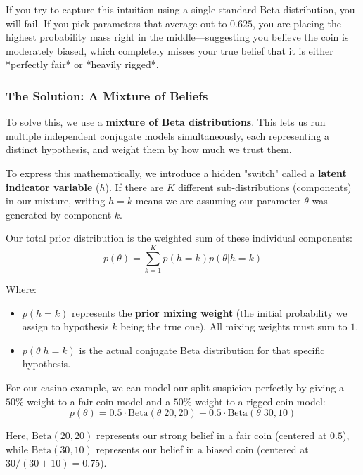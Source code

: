 \documentclass{article}
\begin{document}
If you try to capture this intuition using a single standard Beta distribution, you will fail. If you pick parameters that average out to $0.625$, you are placing the highest probability mass right in the middle—suggesting you believe the coin is moderately biased, which completely misses your true belief that it is either *perfectly fair* or *heavily rigged*. 

\subsubsection{The Solution: A Mixture of Beliefs}
To solve this, we use a \textbf{mixture of Beta distributions}. This lets us run multiple independent conjugate models simultaneously, each representing a distinct hypothesis, and weight them by how much we trust them.



To express this mathematically, we introduce a hidden "switch" called a \textbf{latent indicator variable} ($h$). If there are $K$ different sub-distributions (components) in our mixture, writing $h = k$ means we are assuming our parameter $\theta$ was generated by component $k$. 

Our total prior distribution is the weighted sum of these individual components:
\begin{equation}
p(\theta) = \sum_{k=1}^K p(h = k)p(\theta|h = k)
\end{equation}

Where:
\begin{itemize}
    \item $p(h = k)$ represents the \textbf{prior mixing weight} (the initial probability we assign to hypothesis $k$ being the true one). All mixing weights must sum to $1$.
    \item $p(\theta|h = k)$ is the actual conjugate Beta distribution for that specific hypothesis.
\end{itemize}

For our casino example, we can model our split suspicion perfectly by giving a $50\%$ weight to a fair-coin model and a $50\%$ weight to a rigged-coin model:
\begin{equation}
p(\theta) = 0.5 \cdot \text{Beta}(\theta|20, 20) + 0.5 \cdot \text{Beta}(\theta|30, 10)
\end{equation}

Here, $\text{Beta}(20,20)$ represents our strong belief in a fair coin (centered at $0.5$), while $\text{Beta}(30,10)$ represents our belief in a biased coin (centered at $30/(30+10) = 0.75$).
\end{document}
